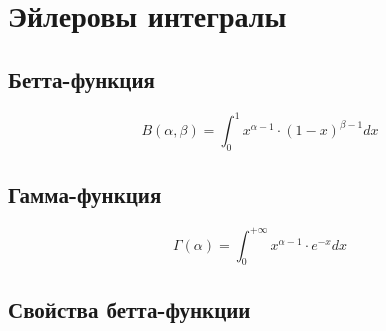\section{Эйлеровы интегралы}

\setcounter{subsection}{120}

\subsection{Бетта-функция}

\[
    \boxed{B(\alpha,\beta) = \int_{0}^{1}x^{\alpha - 1}\cdot (1-x)^{\beta-1}dx}
\]

\subsection{Гамма-функция}

\[
    \boxed{\Gamma(\alpha) = \int_{0}^{+\infty}x^{\alpha-1} \cdot e^{-x} dx}
\]

\subsection{Свойства бетта-функции}

